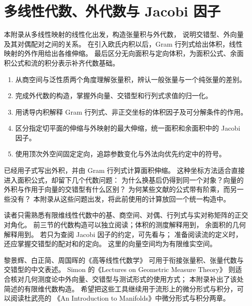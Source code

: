 \chapter{多线性代数、外代数与 Jacobi 因子}
\label{b1:app:B}

\begin{chapterabstract}
本附录从多线性映射的线性化出发，构造张量积与外代数，
说明交错型、外向量及其对偶配对之间的关系。
在引入欧氏内积以后，Gram 行列式给出体积，线性映射的外作用给出各维伸缩。
最后区分无向面积与定向体积，为面积公式、余面积公式和流的积分表示补齐代数基础。
\end{chapterabstract}

\begin{learninggoals}
\begin{enumerate}
\item\label{b1:item:app-b-goal-tensor}
从商空间与泛性质两个角度理解张量积，辨认一般张量与一个纯张量的差别。
\item\label{b1:item:app-b-goal-wedge}
完成外代数的构造，掌握外向量、交错型和行列式求值的归一化。
\item\label{b1:item:app-b-goal-gram}
用诱导内积解释 Gram 行列式、非正交坐标的体积因子及可分解条件的作用。
\item\label{b1:item:app-b-goal-jacobian}
区分指定切平面的伸缩与外映射的最大伸缩，统一面积和余面积中的 Jacobi 因子。
\item\label{b1:item:app-b-goal-orientation}
使用顶次外空间固定定向，追踪参数变化与外法向优先约定中的符号。
\end{enumerate}
\end{learninggoals}

已经用子式写出外积，并由 Gram 行列式计算面积伸缩。
这种坐标方法适合直接进入面积公式，却留下几个代数问题：
为什么换基后仍得到同一个对象？向量的外积与作用于向量的交错型有什么区别？
为何某些文献的公式带有阶乘，而另一些没有？
本附录从这些问题出发，将此前使用的计算放回一个统一构造中。

\ProseParagraphBreak

读者只需熟悉有限维线性代数中的基、商空间、对偶、行列式与实对称矩阵的正交对角化。
前三节的代数构造可以独立阅读；体积的测度解释用到，
余面积的几何解释用到。
若只为查阅 Jacobi 因子的约定，可先看与；
准备阅读流的定义时，还应掌握交错型的配对和的定向。
这里的向量空间均为有限维实空间。

\ProseParagraphBreak

黎景辉、白正简、周国晖的《高等线性代数学》\cite{LiBaiZhou2014AdvancedLinear}%
可用于衔接张量积、张量代数与交错型的中文表述。
Simon 的《Lectures on Geometric Measure Theory》\cite[\S25]{Simon1983Lectures}%
则适合核对几何测度论中外向量、交错型与测试形式的使用方式；
本附录补出了该处简述的有限维代数构造。
希望把这些工具继续用于流形上的微分形式与积分，可以阅读杜武亮的%
《An Introduction to Manifolds》\cite{Tu2011Introduction}中微分形式与积分两章。


